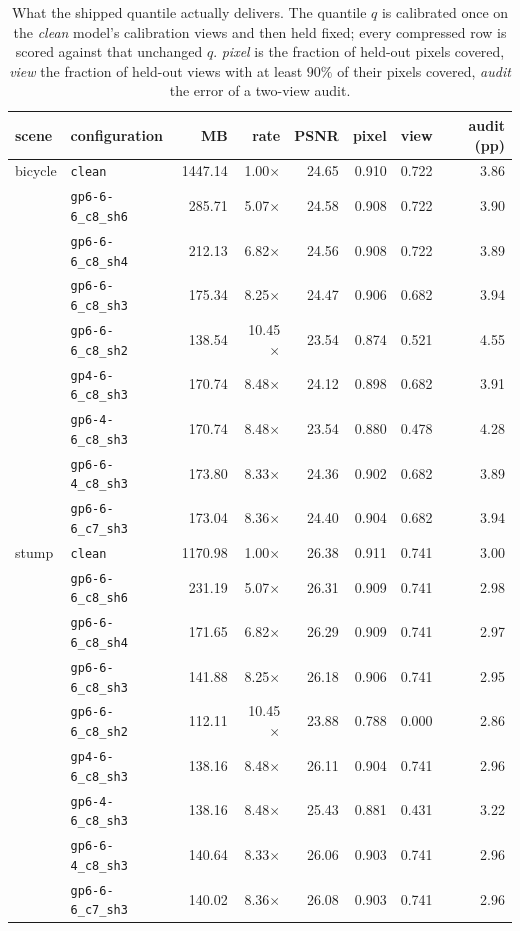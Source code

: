\begin{table}[t]
\centering
\small
\footnotesize
\setlength{\tabcolsep}{3.2pt}
\caption{What the shipped quantile actually delivers. The quantile $q$ is calibrated once on the \emph{clean} model's calibration views and then held fixed; every compressed row is scored against that unchanged $q$. \emph{pixel} is the fraction of held-out pixels covered, \emph{view} the fraction of held-out views with at least $90\%$ of their pixels covered, \emph{audit} the error of a two-view audit.}
\label{tab:viewlevel}
\begin{tabular}{llrrrrrr}
\toprule
scene & configuration & MB & rate & PSNR & pixel & view & audit (pp) \\
\midrule
bicycle & \texttt{clean} & 1447.14 & 1.00$\times$ & 24.65 & 0.910 & 0.722 & 3.86 \\
 & \texttt{gp6-6-6\_c8\_sh6} & 285.71 & 5.07$\times$ & 24.58 & 0.908 & 0.722 & 3.90 \\
 & \texttt{gp6-6-6\_c8\_sh4} & 212.13 & 6.82$\times$ & 24.56 & 0.908 & 0.722 & 3.89 \\
 & \texttt{gp6-6-6\_c8\_sh3} & 175.34 & 8.25$\times$ & 24.47 & 0.906 & 0.682 & 3.94 \\
 & \texttt{gp6-6-6\_c8\_sh2} & 138.54 & 10.45$\times$ & 23.54 & 0.874 & 0.521 & 4.55 \\
 & \texttt{gp4-6-6\_c8\_sh3} & 170.74 & 8.48$\times$ & 24.12 & 0.898 & 0.682 & 3.91 \\
 & \texttt{gp6-4-6\_c8\_sh3} & 170.74 & 8.48$\times$ & 23.54 & 0.880 & 0.478 & 4.28 \\
 & \texttt{gp6-6-4\_c8\_sh3} & 173.80 & 8.33$\times$ & 24.36 & 0.902 & 0.682 & 3.89 \\
 & \texttt{gp6-6-6\_c7\_sh3} & 173.04 & 8.36$\times$ & 24.40 & 0.904 & 0.682 & 3.94 \\
\midrule
stump & \texttt{clean} & 1170.98 & 1.00$\times$ & 26.38 & 0.911 & 0.741 & 3.00 \\
 & \texttt{gp6-6-6\_c8\_sh6} & 231.19 & 5.07$\times$ & 26.31 & 0.909 & 0.741 & 2.98 \\
 & \texttt{gp6-6-6\_c8\_sh4} & 171.65 & 6.82$\times$ & 26.29 & 0.909 & 0.741 & 2.97 \\
 & \texttt{gp6-6-6\_c8\_sh3} & 141.88 & 8.25$\times$ & 26.18 & 0.906 & 0.741 & 2.95 \\
 & \texttt{gp6-6-6\_c8\_sh2} & 112.11 & 10.45$\times$ & 23.88 & 0.788 & 0.000 & 2.86 \\
 & \texttt{gp4-6-6\_c8\_sh3} & 138.16 & 8.48$\times$ & 26.11 & 0.904 & 0.741 & 2.96 \\
 & \texttt{gp6-4-6\_c8\_sh3} & 138.16 & 8.48$\times$ & 25.43 & 0.881 & 0.431 & 3.22 \\
 & \texttt{gp6-6-4\_c8\_sh3} & 140.64 & 8.33$\times$ & 26.06 & 0.903 & 0.741 & 2.96 \\
 & \texttt{gp6-6-6\_c7\_sh3} & 140.02 & 8.36$\times$ & 26.08 & 0.903 & 0.741 & 2.96 \\
\bottomrule
\end{tabular}
\end{table}
